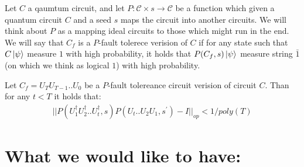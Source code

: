 \documentclass[manuscript,screen,review]{acmart}
\begin{document}
\begin{definition}
  Let $C$ a qaumtum circuit, and let $P : \mathcal{C} \times s  \rightarrow \mathcal{C}$ be a function which given a quantum circuit $C$ and a seed $s$ maps the circuit into another circuits. We will think about $P$ as a mapping ideal circuits to those which might run in the end. We will say that $C_{f}$ is a $P$-fault tolerece verision of $C$ if for any state such that $C\ket{\psi}$ measure $1$ with high probability, it holds that $P(C_{f},s)\ket{\psi}$ measure string $\bar{1}$ (on which we think as logical $1$) with high probability.  
\end{definition}

\begin{claim}
  Let $C_{f} = U_{T}U_{T-1}..U_{0}$ be a $P$-fault tolereance circuit verision of circuit $C$. Than for any $t < T$ it holds that:    
  \begin{equation*}
    \begin{split}
      || P\left(U_{1}^{\dagger} U_{2}^{\dagger}.. U_{t}^{\dagger} ,s \right) P\left(U_{t}.. U_{2} U_{1}, s^{\prime}\right) - I  ||_{op} < 1/poly(T)
    \end{split}
  \end{equation*}
\end{claim}


\section{What we would like to have:}
\end{document}
